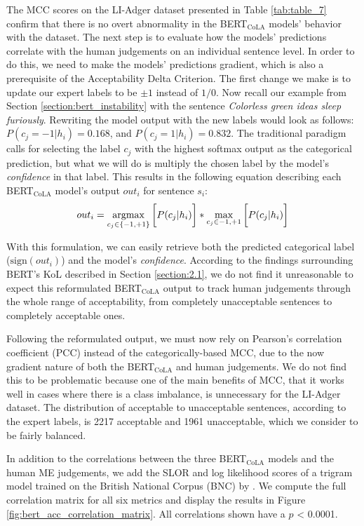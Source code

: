 The MCC scores on the LI-Adger dataset presented in Table \ref{tab:table_7} confirm that there is no overt abnormality in the BERT$_\mathrm{CoLA}$ models' behavior with the dataset.  The next step is to evaluate how the models' predictions correlate with the human judgements on an individual sentence level.  In order to do this, we need to make the models' predictions gradient, which is also a prerequisite of the Acceptability Delta Criterion.  The first change we make is to update our expert labels to be $\pm 1$ instead of $1/0$.  Now recall our example from Section \ref{section:bert_instability} with the sentence \textit{Colorless green ideas sleep furiously}.  Rewriting the model output with the new labels would look as follows: $P(c_j=-1|h_i) = 0.168$, and $P(c_j=1|h_i) = 0.832$.  The traditional paradigm calls for selecting the label $c_j$ with the highest softmax output as the categorical prediction, but what we will do is multiply the chosen label by the model's \textit{confidence} in that label.  This results in the following equation describing each BERT$_\mathrm{CoLA}$ model's output $out_i$ for sentence $s_i$:
\begin{equation}
    out_i = \operatorname*{argmax}_{c_j \in \{-1, +1\}}\bigg [P(c_j|h_i) \bigg] *  \max_{c_j \in {-1, +1}}\bigg [P(c_j|h_i) \bigg]
    \label{eqn:bert_gradient_cola_output}
\end{equation}

With this formulation, we can easily retrieve both the predicted categorical label ($\mathrm{sign}(out_i)$) and the model's \textit{confidence}.  According to the findings surrounding BERT's KoL described in Section \ref{section:2.1}, we do not find it unreasonable to expect this reformulated BERT$_\mathrm{CoLA}$ output to track human judgements through the whole range of acceptability, from completely unacceptable sentences to completely acceptable ones.


Following the reformulated output, we must now rely on Pearson's correlation coefficient (PCC) instead of the categorically-based MCC, due to the now gradient nature of both the BERT$_\mathrm{CoLA}$ and human judgements.  We do not find this to be problematic because one of the main benefits of MCC, that it works well in cases where there is a class imbalance, is unnecessary for the LI-Adger dataset.  The distribution of acceptable to unacceptable sentences, according to the expert labels, is 2217 acceptable and 1961 unacceptable, which we consider to be fairly balanced.

In addition to the correlations between the three BERT$_\mathrm{CoLA}$ models and the human ME judgements, we add the SLOR and log likelihood scores of a trigram model trained on the British National Corpus (BNC) by \citet{sprouse2018colorless}.  We compute the full correlation matrix for all six metrics and display the results in Figure \ref{fig:bert_acc_correlation_matrix}.  All correlations shown have a $p$ < 0.0001.

